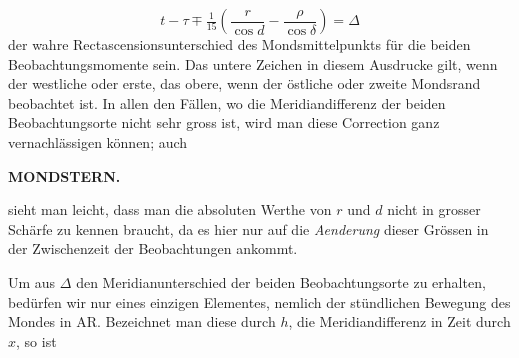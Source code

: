 \[
t-\tau \mp \tfrac{1}{15}\left(\frac{r}{\cos d}-\frac{\rho}{\cos\delta}\right) = \Delta
\]
\noindent der wahre Rectascensionsunterschied des Mondsmittelpunkts für die beiden
Beobachtungsmomente sein. Das untere Zeichen in diesem Ausdrucke gilt, wenn der westliche
oder erste, das obere, wenn der östliche oder zweite Mondsrand beobachtet ist. In allen den
Fällen, wo die Meridiandifferenz der beiden Beobachtungsorte nicht sehr gross ist, wird man
diese Correction ganz vernachlässigen können; auch\par
\clearpage
\thispagestyle{empty}
\noindent{}%
%
\parbox[t]{\dimexpr\linewidth-24mm\relax}{\centering\footnotesize\bfseries MONDSTERN.\par}%
\makebox[12mm][r]{}\par\nobreak\medskip
\noindent sieht man leicht, dass man die absoluten Werthe von $r$ und $d$ nicht in grosser Schärfe zu
kennen braucht, da es hier nur auf die \emph{Aenderung} dieser Grössen in der Zwischenzeit der
Beobachtungen ankommt.

Um aus $\Delta$ den Meridianunterschied der beiden Beobachtungsorte zu erhalten, bedürfen wir
nur eines einzigen Elementes, nemlich der stündlichen Bewegung des Mondes in AR. Bezeichnet
man diese durch $h$, die Meridiandifferenz in Zeit durch $x$, so ist

